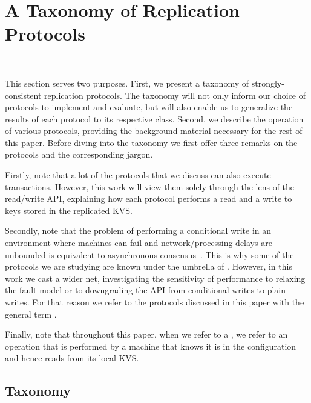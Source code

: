 \section{A Taxonomy of Replication Protocols}~\label{sec:tax}

This section serves two purposes.
First, we present a taxonomy of strongly-consistent replication protocols.
The taxonomy will not only inform our choice of protocols to implement and evaluate, but will also enable us to generalize the results of each protocol to its respective class.
Second, we describe the operation of various protocols, providing the background material necessary for the rest of this paper.
Before diving into the taxonomy we first offer three remarks on the protocols and the corresponding jargon.

Firstly, note that a lot of the protocols that we discuss can also execute transactions. However, this work will view them solely through the lens of the read/write API, explaining how each protocol performs a read and a write to keys stored in the replicated KVS.

Secondly, note that the problem of performing a conditional write in an environment where machines can fail and network/processing delays are unbounded is equivalent to asynchronous consensus~\cite{Herlihy:2008}. 
This is why some of the protocols we are studying are known under the umbrella of . 
However, in this work we cast a wider net, investigating the sensitivity of performance to relaxing the fault model or to 
downgrading the API from conditional writes to plain writes.
For that reason we refer to the protocols discussed in this paper with the general term .

Finally, note that throughout this paper, when we refer to a , we refer to an operation that is performed by a machine that knows it is in the configuration and hence reads from its local KVS.  

\subsection{Taxonomy}

